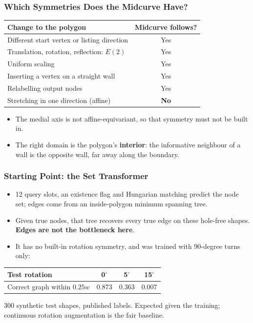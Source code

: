 \begin{frame}[fragile]\frametitle{Which Symmetries Does the Midcurve Have?}
\begin{center}
\small
\begin{tabular}{@{}lc@{}}
\toprule
\textbf{Change to the polygon} & \textbf{Midcurve follows?} \\
\midrule
Different start vertex or listing direction & Yes \\
Translation, rotation, reflection: $E(2)$ & Yes \\
Uniform scaling & Yes \\
Inserting a vertex on a straight wall & Yes \\
Relabelling output nodes & Yes \\
Stretching in one direction (affine) & \textbf{No} \\
\bottomrule
\end{tabular}
\end{center}

\begin{itemize}
\item The medial axis is not affine-equivariant, so that symmetry must not be built in.
\item The right domain is the polygon's \textbf{interior}: the informative neighbour of a wall is the opposite wall, far away along the boundary.
\end{itemize}
\end{frame}

\begin{frame}[fragile]\frametitle{Starting Point: the Set Transformer}
\begin{itemize}
\item 12 query slots, an existence flag and Hungarian matching predict the node set; edges come from an inside-polygon minimum spanning tree.
\item Given true nodes, that tree recovers every true edge on these hole-free shapes. \textbf{Edges are not the bottleneck here}.
\item It has no built-in rotation symmetry, and was trained with 90-degree turns only:
\end{itemize}

\begin{center}
\small
\begin{tabular}{@{}lccc@{}}
\toprule
\textbf{Test rotation} & 0$^\circ$ & 5$^\circ$ & 15$^\circ$ \\
\midrule
Correct graph within $0.25w$ & 0.873 & 0.363 & 0.007 \\
\bottomrule
\end{tabular}
\end{center}

{\footnotesize 300 synthetic test shapes, published labels. Expected given the training; continuous rotation augmentation is the fair baseline.}
\end{frame}

